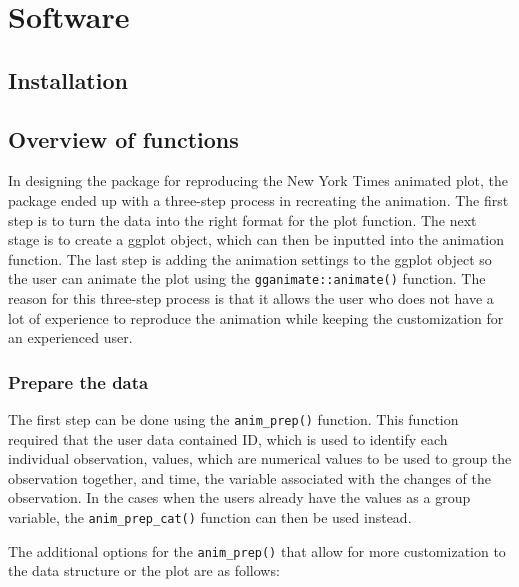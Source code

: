 \hypertarget{software}{%
\section{Software}\label{software}}

\hypertarget{installation}{%
\subsection{Installation}\label{installation}}

\hypertarget{overview-of-functions}{%
\subsection{Overview of functions}\label{overview-of-functions}}

In designing the package for reproducing the New York Times animated plot, the package ended up with a three-step process in recreating the animation. The first step is to turn the data into the right format for the plot function. The next stage is to create a ggplot object, which can then be inputted into the animation function. The last step is adding the animation settings to the ggplot object so the user can animate the plot using the \texttt{gganimate::animate()} function. The reason for this three-step process is that it allows the user who does not have a lot of experience to reproduce the animation while keeping the customization for an experienced user.

\hypertarget{prepare-the-data}{%
\subsubsection{Prepare the data}\label{prepare-the-data}}

The first step can be done using the \texttt{anim\_prep()} function. This function required that the user data contained ID, which is used to identify each individual observation, values, which are numerical values to be used to group the observation together, and time, the variable associated with the changes of the observation. In the cases when the users already have the values as a group variable, the \texttt{anim\_prep\_cat()} function can then be used instead.

The additional options for the \texttt{anim\_prep()} that allow for more customization to the data structure or the plot are as follows:

